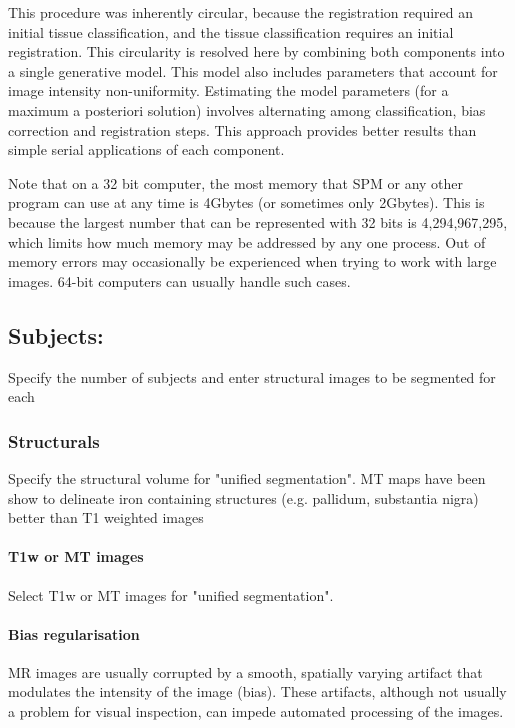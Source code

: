 This procedure was inherently circular, because the registration required an initial tissue classification, and the tissue classification requires an initial registration.  This circularity is resolved here by combining both components into a single generative model. This model also includes parameters that account for image intensity non-uniformity. Estimating the model parameters (for a maximum a posteriori solution) involves alternating among classification, bias correction and registration steps. This approach provides better results than simple serial applications of each component.



Note that on a 32 bit computer, the most memory that SPM or any other program can use at any time is 4Gbytes (or sometimes only 2Gbytes).  This is because the largest number that can be represented with 32 bits is 4,294,967,295, which limits how much memory may be addressed by any one process.  Out of memory errors may occasionally be experienced when trying to work with large images.  64-bit computers can usually handle such cases.


\subsection{Subjects:}
Specify the number of subjects and enter structural images to be segmented for each


\subsubsection{Structurals}
Specify the structural volume for "unified segmentation". MT maps have been show to delineate iron containing structures (e.g. pallidum, substantia nigra) better than T1 weighted images


\paragraph{T1w or MT images}
Select T1w or MT images for "unified segmentation".


\paragraph{Bias regularisation}
MR images are usually corrupted by a smooth, spatially varying artifact that modulates the intensity of the image (bias). These artifacts, although not usually a problem for visual inspection, can impede automated processing of the images.



